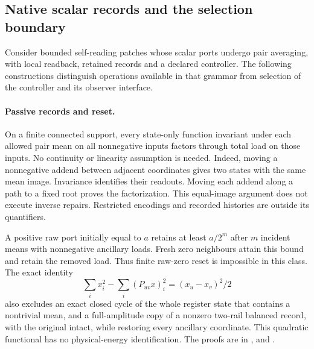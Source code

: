 \subsection{Native scalar records and the selection boundary}
\label{sec:native-record-operations}

Consider bounded self-reading patches whose scalar ports undergo pair
averaging, with local readback, retained records and a declared controller.
The following constructions distinguish operations available in that grammar
from selection of the controller and its observer interface.

\paragraph{Passive records and reset.}
On a finite connected support, every state-only function invariant under
each allowed pair mean on all nonnegative inputs factors through total load on those inputs.
No continuity or linearity assumption is needed. Indeed, moving a nonnegative
addend between adjacent coordinates gives two states with the same mean
image. Invariance identifies their readouts. Moving each addend along a
path to a fixed root proves the factorization. This equal-image argument
does not execute inverse repairs. Restricted encodings and recorded
histories are outside its quantifiers.

A positive raw port initially equal to $a$ retains at least $a/2^m$ after
$m$ incident means with nonnegative ancillary loads. Fresh zero neighbours
attain this bound and retain the removed load. Thus finite raw-zero reset
is impossible in this class. The exact identity
\[
 \sum_i x_i^2-\sum_i (P_{uv}x)_i^2=(x_u-x_v)^2/2
\]
also excludes an exact closed cycle of the whole register state that contains
a nontrivial mean, and a full-amplitude copy of a nonzero two-rail balanced
record, with the original intact, while restoring every ancillary coordinate. This quadratic functional
has no physical-energy identification. The proofs are in
,
 and
.

